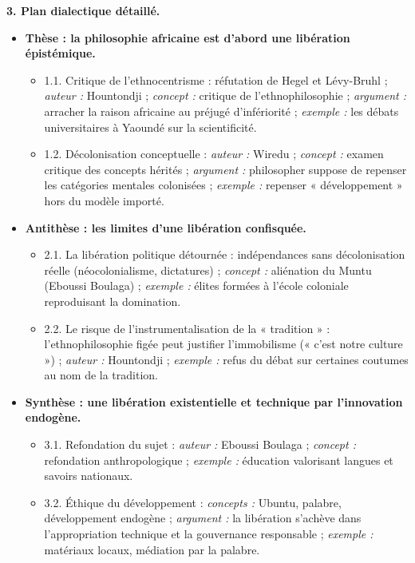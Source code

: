\documentclass[11pt]{article}
\begin{document}
\begin{corrige}
\textbf{3. Plan dialectique détaillé.}
\begin{itemize}
    \item \textbf{Thèse : la philosophie africaine est d'abord une libération épistémique.}
    \begin{itemize}
        \item 1.1. Critique de l'ethnocentrisme : réfutation de Hegel et Lévy-Bruhl ; \emph{auteur :} Hountondji ; \emph{concept :} critique de l'ethnophilosophie ; \emph{argument :} arracher la raison africaine au préjugé d'infériorité ; \emph{exemple :} les débats universitaires à Yaoundé sur la scientificité.
        \item 1.2. Décolonisation conceptuelle : \emph{auteur :} Wiredu ; \emph{concept :} examen critique des concepts hérités ; \emph{argument :} philosopher suppose de repenser les catégories mentales colonisées ; \emph{exemple :} repenser « développement » hors du modèle importé.
    \end{itemize}
    \item \textbf{Antithèse : les limites d'une libération confisquée.}
    \begin{itemize}
        \item 2.1. La libération politique détournée : indépendances sans décolonisation réelle (néocolonialisme, dictatures) ; \emph{concept :} aliénation du Muntu (Eboussi Boulaga) ; \emph{exemple :} élites formées à l'école coloniale reproduisant la domination.
        \item 2.2. Le risque de l'instrumentalisation de la « tradition » : l'ethnophilosophie figée peut justifier l'immobilisme (« c'est notre culture ») ; \emph{auteur :} Hountondji ; \emph{exemple :} refus du débat sur certaines coutumes au nom de la tradition.
    \end{itemize}
    \item \textbf{Synthèse : une libération existentielle et technique par l'innovation endogène.}
    \begin{itemize}
        \item 3.1. Refondation du sujet : \emph{auteur :} Eboussi Boulaga ; \emph{concept :} refondation anthropologique ; \emph{exemple :} éducation valorisant langues et savoirs nationaux.
        \item 3.2. Éthique du développement : \emph{concepts :} Ubuntu, palabre, développement endogène ; \emph{argument :} la libération s'achève dans l'appropriation technique et la gouvernance responsable ; \emph{exemple :} matériaux locaux, médiation par la palabre.
    \end{itemize}
\end{itemize}


\end{corrige}
\end{document}
